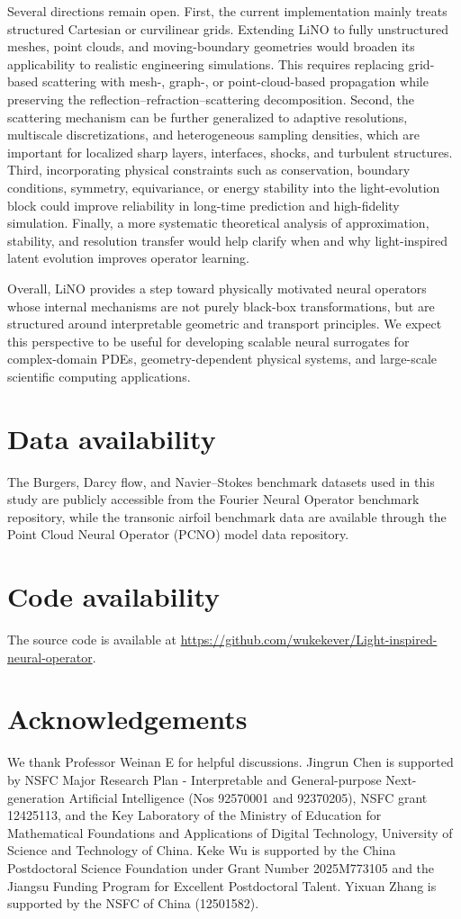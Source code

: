\documentclass{article}
\begin{document}
Several directions remain open. 
First, the current implementation mainly treats structured Cartesian or curvilinear grids. 
Extending LiNO to fully unstructured meshes, point clouds, and moving-boundary geometries would broaden its applicability to realistic engineering simulations. 
This requires replacing grid-based scattering with mesh-, graph-, or point-cloud-based propagation while preserving the reflection--refraction--scattering decomposition. 
Second, the scattering mechanism can be further generalized to adaptive resolutions, multiscale discretizations, and heterogeneous sampling densities, which are important for localized sharp layers, interfaces, shocks, and turbulent structures. 
Third, incorporating physical constraints such as conservation, boundary conditions, symmetry, equivariance, or energy stability into the light-evolution block could improve reliability in long-time prediction and high-fidelity simulation. 
Finally, a more systematic theoretical analysis of approximation, stability, and resolution transfer would help clarify when and why light-inspired latent evolution improves operator learning.

Overall, LiNO provides a step toward physically motivated neural operators whose internal mechanisms are not purely black-box transformations, but are structured around interpretable geometric and transport principles. 
We expect this perspective to be useful for developing scalable neural surrogates for complex-domain PDEs, geometry-dependent physical systems, and large-scale scientific computing applications.


\section*{Data availability}
The Burgers, Darcy flow, and Navier–Stokes benchmark datasets used in this study are publicly accessible from the Fourier Neural Operator benchmark repository, while the transonic airfoil benchmark data are available through the Point Cloud Neural Operator (PCNO) model data repository.


\section*{Code availability}
The source code is available at \url{https://github.com/wukekever/Light-inspired-neural-operator}.


\section*{Acknowledgements}
We thank Professor Weinan E for helpful discussions. Jingrun Chen is supported by NSFC Major Research Plan -  Interpretable and General-purpose Next-generation Artificial Intelligence (Nos 92570001 and 92370205), NSFC grant 12425113, and the Key Laboratory of the Ministry of Education for Mathematical Foundations and Applications of Digital Technology, University of Science and Technology of China. Keke Wu is supported by the China Postdoctoral Science Foundation under Grant Number 2025M773105 and the Jiangsu Funding Program for Excellent Postdoctoral Talent. Yixuan Zhang is supported by the NSFC of China (12501582). 
\end{document}
